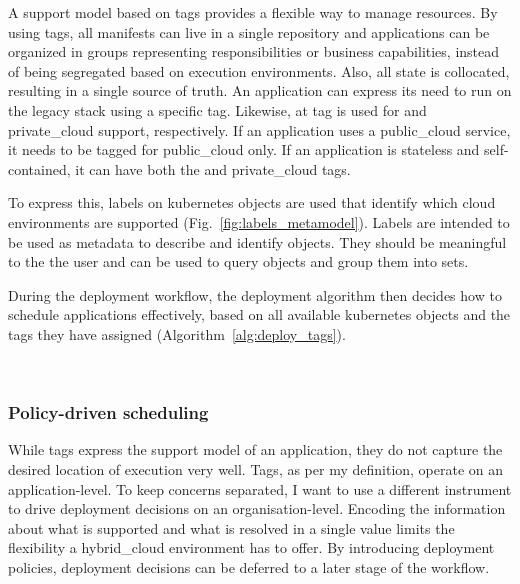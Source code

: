 \documentclass[../main.tex]{subfiles}
\begin{document}
    A support model based on tags provides a flexible way to manage resources.
    By using tags, all manifests can live in a single repository and applications can be organized in groups representing responsibilities or business capabilities, instead of being segregated based on execution environments.
    Also, all state is collocated, resulting in a single source of truth.
    An application can express its need to run on the legacy stack using a specific tag.
    Likewise, at tag is used for  and \gls{private_cloud} support, respectively.
    If an application uses a \gls{public_cloud} service, it needs to be tagged for \gls{public_cloud} only.
    If an application is stateless and self-contained, it can have both the  and \gls{private_cloud} tags.

    To express this, labels on \gls{kubernetes} objects are used that identify which \gls{cloud} environments are supported (Fig.~\ref{fig:labels_metamodel}).
    Labels are intended to be used as metadata to describe and identify objects.
    They should be meaningful to the the user and can be used to query objects and group them into sets.\cite{k8_api_labels}

    

    During the deployment workflow, the deployment algorithm then decides how to schedule applications effectively, based on all available \gls{kubernetes} objects and the tags they have assigned (Algorithm~\ref{alg:deploy_tags}).

    ~\\
    

    \subsubsection{Policy-driven scheduling}

    While tags express the support model of an application, they do not capture the desired location of execution very well.
    Tags, as per my definition, operate on an application-level.
    To keep concerns separated, I want to use a different instrument to drive deployment decisions on an organisation-level.
    Encoding the information about what is supported and what is resolved in a single value limits the flexibility a \gls{hybrid_cloud} environment has to offer.
    By introducing deployment policies, deployment decisions can be deferred to a later stage of the workflow.
\end{document}
